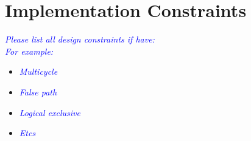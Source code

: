 
\clearpage

\section{Implementation Constraints}
\noindent\textit{\small\textcolor{blue}{Please list all design constraints if have: \\
For example:
}}
\begin{itemize}
    \item \noindent\textit{\small\textcolor{blue}{Multicycle}}
    \item \noindent\textit{\small\textcolor{blue}{False path}}
    \item \noindent\textit{\small\textcolor{blue}{Logical exclusive}} 
    \item \noindent\textit{\small\textcolor{blue}{Etcs}}
\end{itemize}